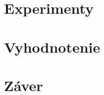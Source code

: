 \documentclass[runningheads]{llncs}
\begin{document}
\section{Experimenty}

\section{Vyhodnotenie}

\section{Záver}

\end{document}
